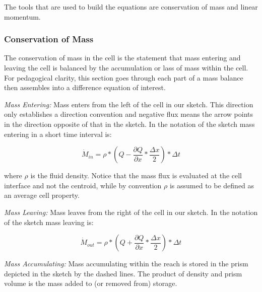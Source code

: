 The tools that are used to build the equations are conservation of mass and linear momentum.


\subsubsection{Conservation of Mass}
The conservation of mass in the cell is the statement that mass entering and leaving the cell is balanced by the accumulation or lass of mass within the cell.   For pedagogical clarity, this section goes through each part of a mass balance then assembles into a difference equation of interest.    

\textsl{Mass Entering:}  Mass enters from the left of the cell in our sketch.  This direction only establishes a direction convention and negative flux means the arrow points in the direction opposite of that in the sketch.  In the notation of the sketch mass entering in a short time interval is:


\begin{equation}
\dot{M}_{in}= \rho * ( Q-\frac{\partial Q}{\partial x}*\frac{\Delta x}{2})*\Delta t
\end{equation}

where $\rho$ is the fluid density.  Notice that the mass flux is evaluated at the cell interface and not the centroid, while by convention $\rho$ is assumed to be defined as an average cell property.

\textsl{Mass Leaving:}  Mass leaves from the right of the cell in our sketch.    In the notation of the sketch mass leaving is:

\begin{equation}
\dot{M}_{out}= \rho * ( Q+\frac{\partial Q}{\partial x}*\frac{\Delta x}{2})*\Delta t
\end{equation}

\textsl{Mass Accumulating:}  Mass accumulating within the reach is stored in the prism depicted in the sketch by the dashed lines.  The product of density and prism volume is the mass added to (or removed from) storage.  

